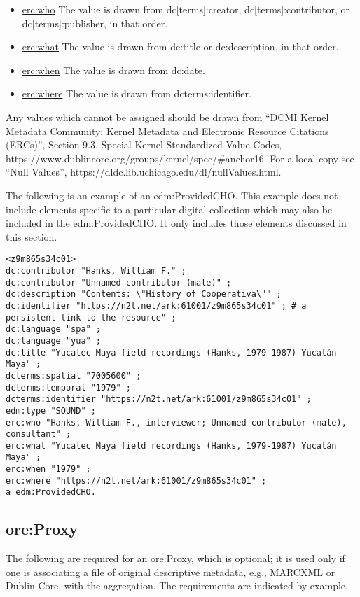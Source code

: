 \documentclass[11pt]{article}
\begin{document}
\begin{itemize}
\item \underline{erc:who} The value is drawn from dc[terms]:creator, dc[terms]:contributor, or dc[terms]:publisher, in that order.
\item \underline{erc:what} The value is drawn from dc:title or dc:description, in that order.
\item \underline{erc:when} The value is drawn from dc:date.
\item \underline{erc:where} The value is drawn from dcterms:identifier.
\end{itemize}

Any values which cannot be assigned should be drawn from ``DCMI Kernel Metadata Community: Kernel Metadata and Electronic Resource Citations (ERCs)'', Section 9.3, Special Kernel Standardized Value Codes, https://www.dublincore.org/groups/kernel/spec/\#anchor16. For a local copy see ``Null Values'', https://dldc.lib.uchicago.edu/dl/nullValues.html.

The following is an example of an edm:ProvidedCHO. This example does not include elements specific to a particular digital collection which may also be included in the edm:ProvidedCHO. It only includes those elements discussed in this section.

\begin{verbatim}
<z9m865s34c01>
dc:contributor "Hanks, William F." ;
dc:contributor "Unnamed contributor (male)" ;
dc:description "Contents: \"History of Cooperativa\"" ;
dc:identifier "https://n2t.net/ark:61001/z9m865s34c01" ; # a persistent link to the resource" ;
dc:language "spa" ;
dc:language "yua" ;
dc:title "Yucatec Maya field recordings (Hanks, 1979-1987) Yucatán Maya" ;
dcterms:spatial "7005600" ;
dcterms:temporal "1979" ;
dcterms:identifier "https://n2t.net/ark:61001/z9m865s34c01" ;
edm:type "SOUND" ;
erc:who "Hanks, William F., interviewer; Unnamed contributor (male), consultant" ;
erc:what "Yucatec Maya field recordings (Hanks, 1979-1987) Yucatán Maya" ;
erc:when "1979" ;
erc:where "https://n2t.net/ark:61001/z9m865s34c01" ;
a edm:ProvidedCHO.
\end{verbatim}

\subsection{ore:Proxy}

The following are required for an ore:Proxy, which is optional; it is used only if one is associating a file of original descriptive metadata, e.g., MARCXML or Dublin Core, with the aggregation. The requirements are indicated by example. 
\end{document}
